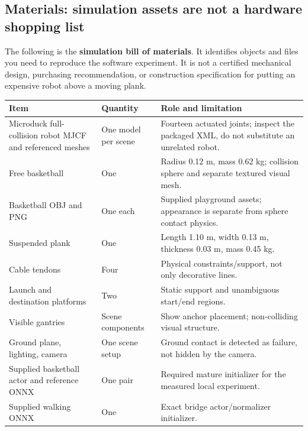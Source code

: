 \documentclass[
  american,
  11pt,
  letterpaper,
]{article}
\newcounter{none} %
\begin{document}
\subsection{Materials: simulation assets are not a hardware shopping
list}\label{materials-simulation-assets-are-not-a-hardware-shopping-list}

The following is the \textbf{simulation bill of materials}. It
identifies objects and files you need to reproduce the software
experiment. It is not a certified mechanical design, purchasing
recommendation, or construction specification for putting an expensive
robot above a moving plank.

{\def\LTcaptype{none} %
\begin{longtable}[]{@{}
  >{\raggedright\arraybackslash}p{}
  >{\raggedleft\arraybackslash}p{}
  >{\raggedright\arraybackslash}p{}@{}}
\toprule\noalign{}
\begin{minipage}[b]{\linewidth}\raggedright
Item
\end{minipage} & \begin{minipage}[b]{\linewidth}\raggedleft
Quantity
\end{minipage} & \begin{minipage}[b]{\linewidth}\raggedright
Role and limitation
\end{minipage} \\
\midrule\noalign{}
\endhead
\bottomrule\noalign{}
\endlastfoot
Microduck full-collision robot MJCF and referenced meshes & One model
per scene & Fourteen actuated joints; inspect the packaged XML, do not
substitute an unrelated robot. \\
Free basketball & One & Radius 0.12 m, mass 0.62 kg; collision sphere
and separate textured visual mesh. \\
Basketball OBJ and PNG & One each & Supplied playground assets;
appearance is separate from sphere contact physics. \\
Suspended plank & One & Length 1.10 m, width 0.13 m, thickness 0.03 m,
mass 0.45 kg. \\
Cable tendons & Four & Physical constraints/support, not only decorative
lines. \\
Launch and destination platforms & Two & Static support and unambiguous
start/end regions. \\
Visible gantries & Scene components & Show anchor placement;
non-colliding visual structure. \\
Ground plane, lighting, camera & One scene setup & Ground contact is
detected as failure, not hidden by the camera. \\
Supplied basketball actor and reference ONNX & One pair & Required
mature initializer for the measured local experiment. \\
Supplied walking ONNX & One & Exact bridge actor/normalizer
initializer. \\
\end{longtable}
}
\end{document}
